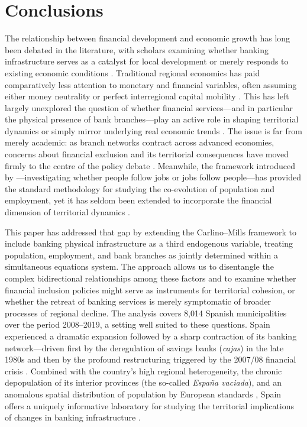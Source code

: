 \documentclass[a4paper,11pt,oneside]{article}
\begin{document}
{\section{Conclusions}
\label{sec:conclusions}

The relationship between financial development and economic growth has long been debated in the literature, with scholars examining whether banking infrastructure serves as a catalyst for local development or merely responds to existing economic conditions \citep{levine.handbook.growth,jayartne-strahan-qje96,arcand2015too}. Traditional regional economics has paid comparatively less attention to monetary and financial variables, often assuming either money neutrality or perfect interregional capital mobility \citep{dow1997regional}. This has left largely unexplored the question of whether financial services---and in particular the physical presence of bank branches---play an active role in shaping territorial dynamics or simply mirror underlying real economic trends \citep{ergungor2010bank,rossi2021financial,sokol2017financialisation}. The issue is far from merely academic: as branch networks contract across advanced economies, concerns about financial exclusion and its territorial consequences have moved firmly to the centre of the policy debate \citep{crosignani2025financial,rodriguez2025banking,leyshon.thrift1995geographies}. Meanwhile, the framework introduced by \citet{carlino1987determinants}---investigating whether people follow jobs or jobs follow people---has provided the standard methodology for studying the co-evolution of population and employment, yet it has seldom been extended to incorporate the financial dimension of territorial dynamics \citep{hoogstra2017jobs,hasan2019economic,lim2025proximity}.

This paper has addressed that gap by extending the Carlino--Mills framework to include banking physical infrastructure as a third endogenous variable, treating population, employment, and bank branches as jointly determined within a simultaneous equations system. The approach allows us to disentangle the complex bidirectional relationships among these factors and to examine whether financial inclusion policies might serve as instruments for territorial cohesion, or whether the retreat of banking services is merely symptomatic of broader processes of regional decline. The analysis covers 8,014 Spanish municipalities over the period 2008--2019, a setting well suited to these questions. Spain experienced a dramatic expansion followed by a sharp contraction of its banking network---driven first by the deregulation of savings banks (\textsl{cajas}) in the late 1980s and then by the profound restructuring triggered by the 2007/08 financial crisis \citep{bernad.fuentelsaz.gomez2008deregulation,cunat2010did,martin2017fall}. Combined with the country's high regional heterogeneity, the chronic depopulation of its interior provinces (the so-called \textsl{España vaciada}), and an anomalous spatial distribution of population by European standards \citep{gutierrez2023spatial}, Spain offers a uniquely informative laboratory for studying the territorial implications of changes in banking infrastructure \citep{martin2019financial,goerlich2021distribucion,bandres2021despoblacion}.

}
\end{document}
